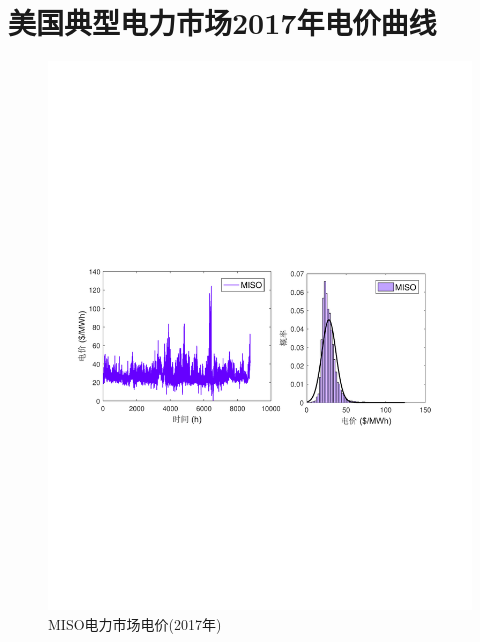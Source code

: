 \chapter{美国典型电力市场2017年电价曲线}
\label{cha:market-price-usa-17}
\begin{figure}[H] %
  \centering
  \includegraphics[scale=0.75]{figures/Chap5-15-Price-MISO.pdf}
  \caption{MISO电力市场电价(2017年)}
  \label{fig:Price-MISO}
\end{figure}

